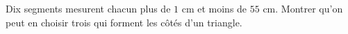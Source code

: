 Dix segments mesurent chacun plus de $1$ cm et moins de $55$ cm. Montrer qu'on peut en choisir trois qui forment les côtés d'un triangle.
